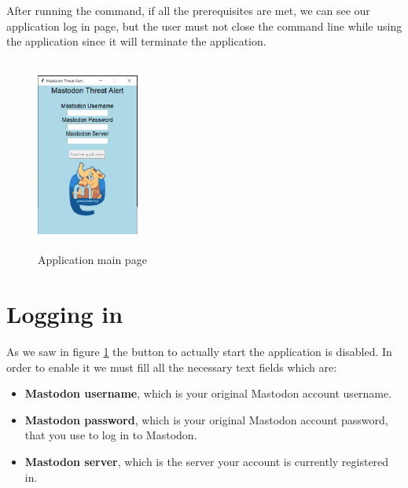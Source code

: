 After running the command, if all the prerequisites are met, we can see 
our application log in page, but the user must not close the command line while using the application since it will terminate the application.
\begin{figure}[H]
	\centering
	\includegraphics[width=0.3\textwidth,height=240px]{images/mainpageapp.png}
	\caption{Application main page}
	\label{fig:empty_page}
\end{figure}

\section{Logging in}
\label{s:Logging_in}
As we saw in figure \ref{fig:empty_page} the button to actually start the application is disabled.
In order to enable it we must fill all the necessary text fields which are:
\begin{itemize}
	\item \textbf{Mastodon username}, which is your original Mastodon account username.
	\item \textbf{Mastodon password}, which is your original Mastodon account password, that you use to log in to Mastodon.
	\item \textbf{Mastodon server}, which is the server your account is currently registered in.
\end{itemize}

